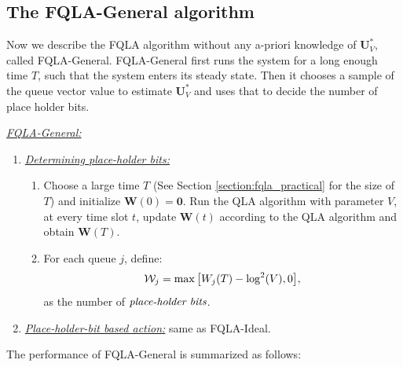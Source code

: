 \documentclass[journal]{IEEEtran}
\newcommand{\bv}[1]{{\boldsymbol{#1} }}
\newcommand{\script}[1]{{{\cal{#1} }}}
\begin{document}


\subsection{The FQLA-General algorithm}
Now we describe the FQLA algorithm without any a-priori knowledge of $\bv{U}^*_V$, called FQLA-General. FQLA-General first runs the system for a long enough time $T$, such that the system enters its steady state. Then it chooses a sample of the queue vector value to estimate $\bv{U}^*_V$ and uses that to decide the number of place holder bits.  %

\emph{\underline{FQLA-General:}} 
\begin{enumerate}
\item[(I)] \emph{\underline{Determining place-holder bits:}} 
\begin{enumerate}
\item Choose a large time $T$ (See Section \ref{section:fqla_practical} for the size of $T$)  and initialize $\bv{W}(0)=\bv{0}$. Run the QLA algorithm with parameter $V$, at every time slot $t$, update $\bv{W}(t)$ according to the QLA algorithm and obtain $\bv{W}(T)$. 
\item For each queue $j$, define:  
\begin{eqnarray}
\script{W}_j=\max\big[W_j(T)-\log^2(V),0\big],
\end{eqnarray}
as the number of $\emph{place-holder bits}$. 
\end{enumerate}
\item[(II)] \emph{\underline{Place-holder-bit based action:}} same as FQLA-Ideal.%
\end{enumerate}
The performance of FQLA-General is summarized as follows:
\end{document}
